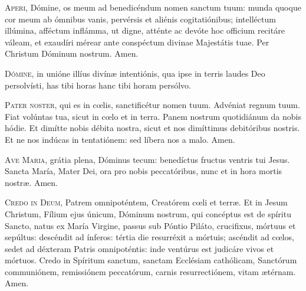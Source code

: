 \documentclass[nocturnale-dominicis.tex]{subfiles}
\begin{document}

\begin{multicols}{2}
\lettrine{A}{peri}, Dómine, os meum ad benedicéndum nomen sanctum tuum: munda quoque cor meum ab ómnibus vanis, pervérsis et aliénis 
cogitatiónibus; intelléctum illúmina, afféctum inflámma, ut digne, atténte ac devóte hoc officium recitáre váleam, et exaudíri mérear
ante conspéctum divinae Majestátis tuae. Per Christum Dóminum nostrum. Amen.

\lettrine{D}{ómine}, in unióne illíus divínæ intentiónis, qua ipse in terris laudes Deo persolvísti, has tibi horas  hanc tibi horam\rubric{)} persólvo.
\end{multicols}

\begin{multicols}{2}
\lettrine{P}{ater noster}, qui es in cœlis, sanctificétur nomen tuum. Advéniat regnum tuum. Fiat volúntas tua, sicut in cœlo et in terra.
Panem nostrum quotidiánum da nobis hódie. Et dimítte nobis débita nostra, sicut et nos dimíttimus debitóribus nostris. Et ne nos
indúcas in tentatiónem: sed líbera nos a malo. Amen.

\lettrine{A}{ve Maria}, grátia plena, Dóminus tecum: benedíctus fructus ventris tui Jesus. Sancta María, Mater Dei, ora pro nobis 
peccatóribus, nunc et in hora mortis nostræ. Amen.

\lettrine{C}{redo in Deum}, Patrem omnipoténtem, Creatórem cœli et terræ. Et in Jesum Christum, Fílium ejus únicum, Dóminum nostrum,
qui concéptus est de spíritu Sancto, natus ex María Virgine, passus sub Póntio Piláto, crucifixus, mórtuus et sepúltus: descéndit
ad ínferos: tértia die resurréxit a mórtuis; ascéndit ad cœlos, sedet ad déxteram Patris omnipoténtis: inde ventúrus est judicáre
vivos et mórtuos. Credo in Spíritum sanctum, sanctam Ecclésiam cathólicam, Sanctórum communiónem, remissiónem peccatórum,
carnis resurrectiónem, vitam ætérnam. Amen.
\end{multicols}



\end{document}
